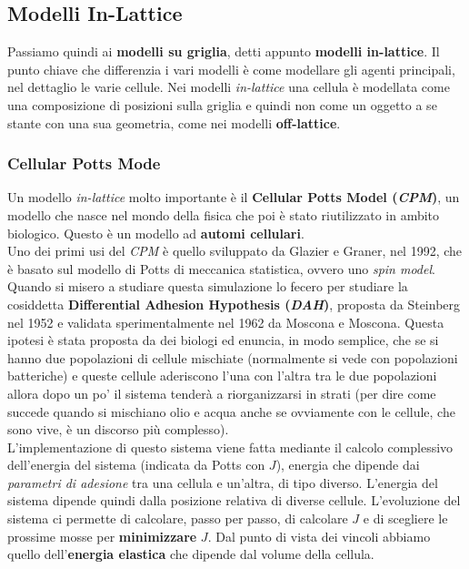 \documentclass[a4paper,12pt, oneside]{book}
\begin{document}
\subsection{Modelli In-Lattice}
Passiamo quindi ai \textbf{modelli su griglia}, detti appunto \textbf{modelli
  in-lattice}. Il punto chiave che differenzia i vari modelli è come modellare
gli agenti principali, nel dettaglio le varie cellule. Nei modelli
\textit{in-lattice} una cellula è modellata come una composizione di posizioni
sulla griglia e quindi non come un oggetto a se stante con una sua geometria,
come nei modelli \textbf{off-lattice}.
\subsubsection{Cellular Potts Mode}
Un modello \textit{in-lattice} molto importante è il \textbf{Cellular Potts
  Model (\textit{CPM})}, un modello che nasce nel mondo della fisica che poi è
stato riutilizzato in ambito biologico. Questo è un modello ad \textbf{automi
  cellulari}.\\
Uno dei primi usi del \textit{CPM} è quello sviluppato da Glazier e Graner, nel
1992, che è basato sul modello di Potts di meccanica statistica, ovvero uno
\textit{spin model}. Quando si misero a studiare questa simulazione lo fecero
per studiare la cosiddetta \textbf{Differential Adhesion Hypothesis
  (\textit{DAH})}, proposta da Steinberg nel 1952 e validata sperimentalmente
nel 1962 da Moscona e Moscona. Questa ipotesi è stata proposta da dei biologi ed
enuncia, in modo semplice, che se si hanno due popolazioni di cellule mischiate
(normalmente si vede con popolazioni batteriche) e queste cellule aderiscono
l'una con l'altra tra le due popolazioni allora dopo un po' il sistema tenderà a
riorganizzarsi in strati (per dire come succede quando si mischiano olio e
acqua anche se ovviamente con le cellule, che sono vive, è un discorso più
complesso).\\
L'implementazione di questo sistema viene fatta mediante il calcolo complessivo
dell'energia del sistema (indicata da Potts con $J$), energia che dipende dai
\textit{parametri di adesione} tra una cellula e un'altra, di tipo
diverso. L'energia del sistema dipende quindi dalla posizione relativa di
diverse cellule. L'evoluzione del sistema ci permette di calcolare, passo per
passo, di calcolare $J$ e di scegliere le prossime mosse per
\textbf{minimizzare} $J$. Dal punto di vista dei vincoli abbiamo quello
dell'\textbf{energia elastica} che dipende dal volume della cellula. \\
\end{document}

